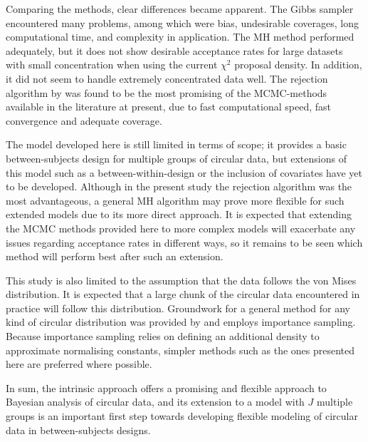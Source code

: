 \documentclass[]{gSCS2e}
\theoremstyle{plain}
\theoremstyle{definition}
\theoremstyle{remark}
\begin{document}
Comparing the methods, clear differences became apparent. The Gibbs sampler encountered many problems, among which were bias, undesirable coverages, long computational time, and complexity in application. The MH method performed adequately, but it does not show desirable acceptance rates for large datasets with small concentration when using the current $\chi^2$ proposal density. In addition, it did not seem to handle extremely concentrated data well. The rejection algorithm by \citet{forbes2014fast} was found to be the most promising of the MCMC-methods available in the literature at present, due to fast computational speed, fast convergence and adequate coverage.

The model developed here is still limited in terms of scope; it provides a basic between-subjects design for multiple groups of circular data, but extensions of this model such as a between-within-design or the inclusion of covariates have yet to be developed. Although in the present study the rejection algorithm was the most advantageous, a general MH algorithm may prove more flexible for such extended models due to its more direct approach. It is expected that extending the MCMC methods provided here to more complex models will exacerbate any issues regarding acceptance rates in different ways, so it remains to be seen which method will perform best after such an extension. 

This study is also limited to the assumption that the data follows the von Mises distribution. It is expected that a large chunk of the circular data encountered in practice will follow this distribution. Groundwork for a general method for any kind of circular distribution was provided by \citet{Bhattacharya2009} and employs importance sampling. Because importance sampling relies on defining an additional density to approximate normalising constants, simpler methods such as the ones presented here are preferred where possible. 

In sum, the intrinsic approach offers a promising and flexible approach to Bayesian analysis of circular data, and its extension to a model with $J$ multiple groups is an important first step towards developing flexible modeling of circular data in between-subjects designs. 



\end{document}
